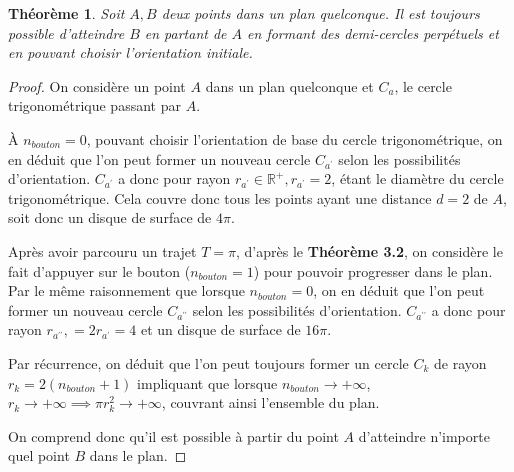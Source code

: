 \documentclass[a4paper]{amsart}
\newtheorem{theorem}{Théorème}[section]
\theoremstyle{definition}
\theoremstyle{remark}
\numberwithin{equation}{section}
\begin{document}
\begin{theorem}
  Soit $A,B$ deux points dans un plan quelconque. Il est toujours possible d'atteindre $B$ en partant de $A$ en formant des demi-cercles  perpétuels et en pouvant choisir l'orientation initiale.
\end{theorem}

\begin{proof}
  On considère un point $A$ dans un plan quelconque et $C_a$, le cercle trigonométrique passant par $A$.

  À $n_{bouton}=0$, pouvant choisir l'orientation de base du cercle trigonométrique, on en déduit que l'on peut former un nouveau cercle $C_{a^\prime}$ selon les possibilités d'orientation.  $C_{a^\prime}$ a donc pour rayon $r_{a^\prime}\in\mathbb{R^+}, r_{a^\prime}=2$, étant le
  diamètre du cercle trigonométrique. Cela couvre donc tous les points ayant une distance $d=2$ de $A$, soit donc un disque de surface de $4\pi$.

  Après avoir parcouru un trajet $T=\pi$, d'après le \textbf{Théorème 3.2}, on considère le fait d'appuyer sur le bouton ($n_{bouton}=1$) pour pouvoir progresser dans le plan. Par le même raisonnement que lorsque $n_{bouton}=0$,
  on en déduit que l'on peut former un nouveau cercle $C_{a^{\prime\prime}}$ selon les possibilités d'orientation.  $C_{a^{\prime\prime}}$ a donc pour rayon $r_{a^{\prime\prime}},=2r_{a^\prime}=4$ et un disque de surface de $16\pi$.

  Par récurrence, on déduit que l'on peut toujours former un cercle $C_k$ de rayon $r_k=2(n_{bouton}+1)$ impliquant que lorsque $n_{bouton}\to+\infty$, $r_k\to+\infty \implies {\pi}r_k^2\to+\infty$, couvrant ainsi l'ensemble du plan.

  On comprend donc qu'il est possible à partir du point $A$ d'atteindre n'importe quel point $B$ dans le plan.



\end{proof}
\end{document}
